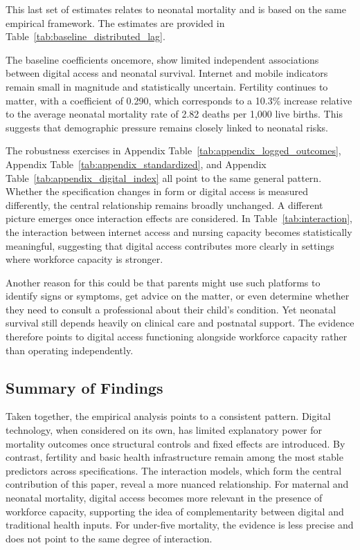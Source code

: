 \documentclass[12pt]{article}
\begin{document}
This last set of estimates relates to neonatal mortality and is based on the same empirical framework. The estimates are provided in Table~\ref{tab:baseline_distributed_lag}.

\medskip
The baseline coefficients oncemore, show limited independent associations between digital access and neonatal survival. Internet and mobile indicators remain small in magnitude and statistically uncertain. Fertility continues to matter, with a coefficient of 0.290, which corresponds to a 10.3\% increase relative to the average neonatal mortality rate of 2.82 deaths per 1,000 live births. This suggests that demographic pressure remains closely linked to neonatal risks.

\medskip
The robustness exercises in Appendix Table~\ref{tab:appendix_logged_outcomes}, Appendix Table~\ref{tab:appendix_standardized}, and Appendix Table~\ref{tab:appendix_digital_index} all point to the same general pattern. Whether the specification changes in form or digital access is measured differently, the central relationship remains broadly unchanged. A different picture emerges once interaction effects are considered. In Table~\ref{tab:interaction}, the interaction between internet access and nursing capacity becomes statistically meaningful, suggesting that digital access contributes more clearly in settings where workforce capacity is stronger.

\medskip
Another reason for this could be that parents might use such platforms to identify signs or symptoms, get advice on the matter, or even determine whether they need to consult a professional about their child’s condition. Yet neonatal survival still depends heavily on clinical care and postnatal support. The evidence therefore points to digital access functioning alongside workforce capacity rather than operating independently.

\subsection{Summary of Findings}

Taken together, the empirical analysis points to a consistent pattern. Digital technology, when considered on its own, has limited explanatory power for mortality outcomes once structural controls and fixed effects are introduced. By contrast, fertility and basic health infrastructure remain among the most stable predictors across specifications. The interaction models, which form the central contribution of this paper, reveal a more nuanced relationship. For maternal and neonatal mortality, digital access becomes more relevant in the presence of workforce capacity, supporting the idea of complementarity between digital and traditional health inputs. For under-five mortality, the evidence is less precise and does not point to the same degree of interaction.
\end{document}
